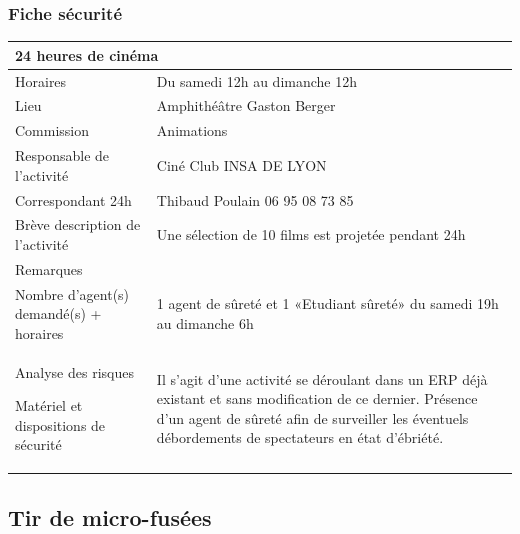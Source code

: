 \documentclass[hidelinks, paper=a4, fontsize=13pt]{report}
\begin{document}
\subsubsection{Fiche sécurité}
\begin{center}
\begin{tabular}{ | p{6cm} | p{10cm} | }
\hline
	\multicolumn{2}{|l|}{24 heures de cinéma}  \\ \hline
	Horaires & Du samedi 12h au dimanche 12h \\ \hline
	Lieu & Amphithéâtre Gaston Berger \\ \hline
	Commission & Animations \\ \hline
	Responsable de l'activité & Ciné Club INSA DE LYON \\ \hline
	Correspondant 24h & Thibaud Poulain 06 95 08 73 85 \\ \hline
	Brève description de l'activité & Une sélection de 10 films est projetée pendant 24h \\ \hline
	Remarques &  \\ \hline
	Nombre d’agent(s) demandé(s) + horaires
 & 1 agent de sûreté et 1 «Etudiant sûreté» du samedi 19h au dimanche 6h \\ \hline
	Analyse des risques

Matériel et dispositions de sécurité & Il s’agit d’une activité se déroulant dans un ERP déjà existant et sans modification de ce dernier.
Présence d’un agent de sûreté afin de surveiller les éventuels débordements de spectateurs en état d’ébriété. \\ \hline
\end{tabular}
\end{center}

\subsection{Tir de micro-fusées}
\end{document}
